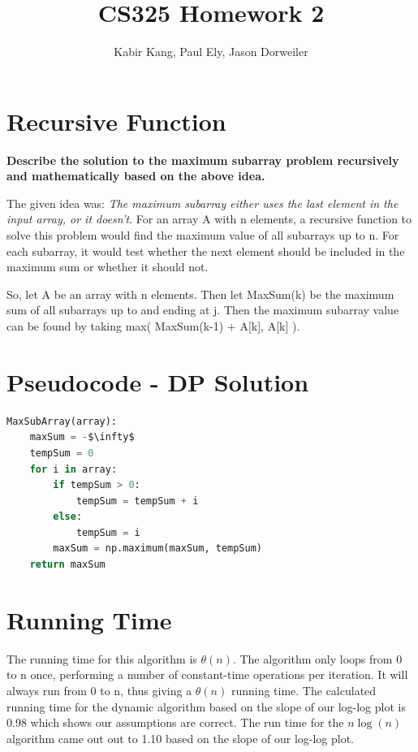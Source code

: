 \documentclass[a4paper,12pt]{article}
\title{CS325 Homework 2}
\author{Kabir Kang, Paul Ely, Jason Dorweiler}
\begin{document}
\maketitle

\section*{Recursive Function}
\textbf{Describe the solution to the maximum subarray problem recursively and mathematically based on the above idea.}

The given idea was: \emph{The maximum subarray either uses the last element in the input array, or it doesn't}. For an array A with n elements, a recursive function to solve this problem would find the maximum value of all subarrays up to n. For each subarray, it would test whether the next element should be included in the maximum sum or whether it should not.

So, let A be an array with n elements. Then let MaxSum(k) be the maximum sum of all subarrays up to and ending at j. Then the maximum subarray value can be found by taking max( MaxSum(k-1) + A[k], A[k] ).



\section*{Pseudocode - DP Solution}
  \begin{lstlisting}[language=python,caption={pseudo code for DP algorithm},mathescape]
MaxSubArray(array):
    maxSum = -$\infty$
    tempSum = 0
    for i in array:
    	if tempSum > 0:
    		tempSum = tempSum + i
    	else:
    		tempSum = i
    	maxSum = np.maximum(maxSum, tempSum)
    return maxSum	
  \end{lstlisting}


\section*{Running Time}

The running time for this algorithm is $\theta(n)$. The algorithm only loops from 0 to n once, performing a number of constant-time operations per iteration. It will always run from 0 to n, thus giving a $\theta(n)$ running time.  The calculated running time for the dynamic algorithm based on the slope of our log-log plot is 0.98 which shows our assumptions are correct.  The run time for the $n\log(n)$ algorithm came out out to 1.10 based on the slope of our log-log plot. 
\end{document}
